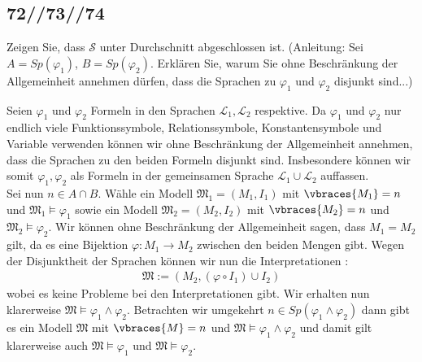 \subsection*{72//73//74}

\begin{exercise}[72]

\phantom{}
	Zeigen Sie, dass $\mathscr{S}$ unter Durchschnitt abgeschlossen ist. (Anleitung: Sei $A = Sp(\varphi_1)$, $B = Sp(\varphi_2)$. Erklären Sie, warum Sie ohne Beschränkung der Allgemeinheit annehmen dürfen, dass die Sprachen zu $\varphi_1$ und $\varphi_2$ disjunkt sind...)

\end{exercise}


\begin{solution}

\phantom{}
	Seien $\varphi_1$ und $\varphi_2$ Formeln in den Sprachen $\mathcal{L}_1, \mathcal{L}_2$
	respektive.
	Da $\varphi_1$ und $\varphi_2$ nur endlich viele Funktionssymbole, Relationssymbole,
	Konstantensymbole und Variable verwenden können wir ohne Beschränkung der Allgemeinheit
	annehmen, dass die Sprachen zu den beiden Formeln disjunkt sind.\newline
	Insbesondere können wir somit $\varphi_1,\varphi_2$ als Formeln in der gemeinsamen Sprache
	$\mathcal{L}_1 \cup \mathcal{L}_2$ auffassen. \\
	Sei nun $n \in A \cap B$. Wähle ein Modell $\mathfrak{M}_1 = (M_1,I_1)$ mit
	$\vbraces{M_1} = n$ und $\mathfrak{M}_1 \vDash \varphi_1$ sowie ein Modell
	$\mathfrak{M}_2 = (M_2,I_2)$
	mit $\vbraces{M_2} = n$ und $\mathfrak{M}_2 \vDash \varphi_2$.
	Wir können ohne Beschränkung der Allgemeinheit sagen, dass $M_1 = M_2$ gilt,
	da es eine Bijektion $\varphi: M_1 \to M_2$ zwischen den beiden Mengen gibt.
	Wegen der Disjunktheit der Sprachen können wir nun die Interpretationen :
	\begin{align*}
	\mathfrak{M} := (M_2, (\varphi\circ I_1) \cup I_2)
	\end{align*}
	wobei es keine Probleme bei den Interpretationen gibt. Wir erhalten nun klarerweise $\mathfrak{M} \vDash \varphi_1 \land \varphi_2$.  \newline
	Betrachten wir umgekehrt $n \in Sp(\varphi_1 \land \varphi_2)$ dann gibt es ein Modell $\mathfrak{M}$ mit $\vbraces{M} = n$ und $\mathfrak{M} \vDash \varphi_1 \land \varphi_2$ und damit gilt klarerweise auch $\mathfrak{M} \vDash \varphi_1$ und $\mathfrak{M} \vDash \varphi_2$.
\end{solution}

